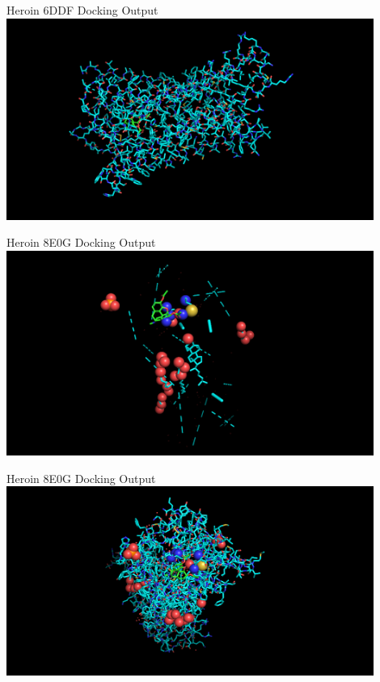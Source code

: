\documentclass{beamer}
\begin{document}
\begin{frame}{Heroin 6DDF Docking Output}
\includegraphics[width=12cm]{img/Graphs/6ddfSide.png}
\end{frame}
\begin{frame}{Heroin 8E0G Docking Output}
\includegraphics[width=12cm]{img/Graphs/8e0gTransparent.png}
\end{frame}
\begin{frame}{Heroin 8E0G Docking Output}
\includegraphics[width=12cm]{img/Graphs/8e0gFull.png}
\end{frame}
\end{document}
